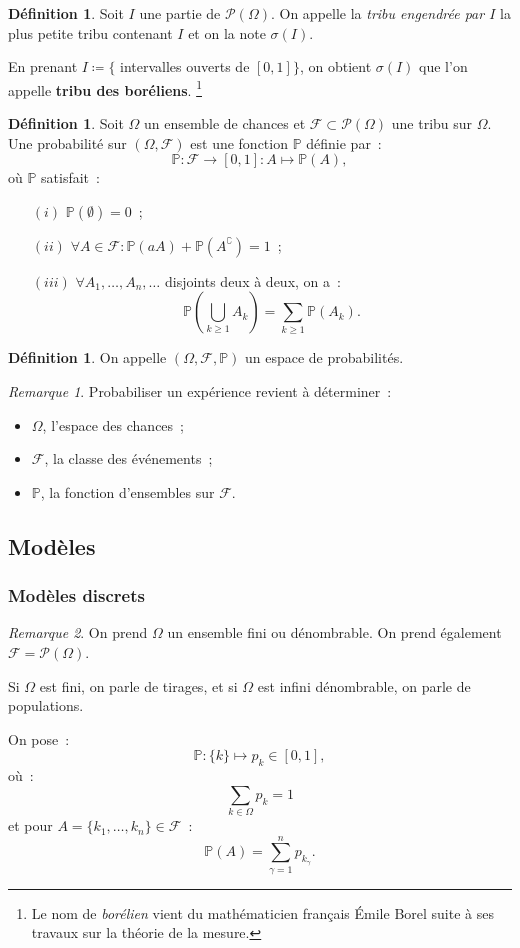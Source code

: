 \documentclass{article}
\renewcommand{\P}{\mathbb P}
\theoremstyle{definition}
\newtheorem{déf}[thm]{Définition}
\theoremstyle{remark}
\newtheorem*{rmq}{Remarque}
\begin{document}
		\begin{déf}\label{boréliens} Soit $I$ une partie de $\mathcal P(\Omega)$. On appelle la \textit{tribu engendrée par $I$} la plus petite tribu contenant
		$I$ et on la note $\sigma(I)$.
		
		En prenant $I \coloneqq \{$ intervalles ouverts de $[0, 1]\}$, on obtient $\sigma(I)$ que l'on appelle \textbf{tribu des boréliens}.
		\footnote{Le nom de \textit{borélien} vient du mathématicien français Émile Borel suite à ses travaux sur la théorie de la mesure.} \end{déf}

		\begin{déf} Soit $\Omega$ un ensemble de chances et $\mathcal F \subset \mathcal P(\Omega)$ une tribu sur $\Omega$. Une probabilité sur
		$(\Omega, \mathcal F)$ est une fonction $\P$ définie par~:
		\[\P : \mathcal F \to [0, 1] : A \mapsto \P(A),\]
		où $\P$ satisfait~:

		\begin{itemize}
			\item[$(i)$] $\P(\emptyset) = 0$~;
			\item[$(ii)$] $\forall A \in \mathcal F : \P(aA) + \P(A^\complement) = 1$~;
			\item[$(iii)$] $\forall A_1, \dotsc, A_n, \ldots$ disjoints deux à deux, on a~:
			               \[\P\left(\bigcup_{k \geq 1}A_k\right) = \sum_{k \geq 1}\P(A_k).\]
		\end{itemize}
		\end{déf}

		\begin{déf} On appelle $(\Omega, \mathcal F, \P)$ un espace de probabilités. \end{déf}

		\begin{rmq} Probabiliser un expérience revient à déterminer~:
		\begin{itemize}
			\item $\Omega$, l'espace des chances~;
			\item $\mathcal F$, la classe des événements~;
			\item $\P$, la fonction d'ensembles sur $\mathcal F$.
		\end{itemize}
		\end{rmq}
	
	\subsection{Modèles}
		\subsubsection{Modèles discrets}
		\begin{rmq} On prend $\Omega$ un ensemble fini ou dénombrable. On prend également $\mathcal F = \mathcal P(\Omega)$.

		Si $\Omega$ est fini, on parle de tirages, et si $\Omega$ est infini dénombrable, on parle de populations.

		On pose~:
		\[\P : \{k\} \mapsto p_k \in [0, 1],\]
		où~:
		\[\sum_{k \in \Omega}p_k = 1\]
		et pour $A = \{k_1, \dotsc, k_n\} \in \mathcal F$~:
		\[\P(A) = \sum_{\gamma=1}^np_{k_\gamma}.\]
		\end{rmq}
\end{document}
